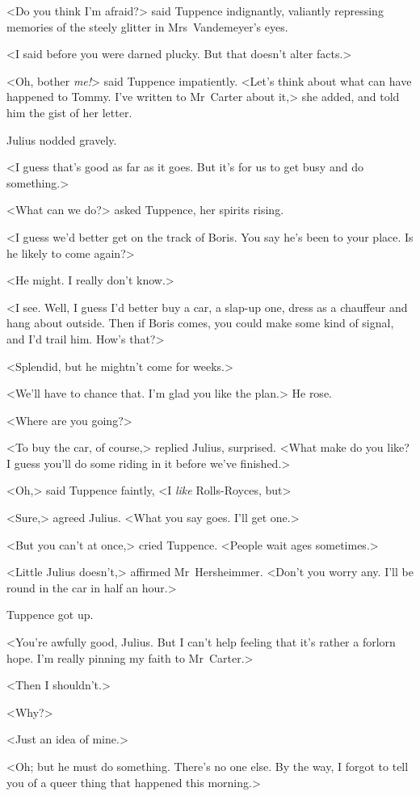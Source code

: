<Do you think I'm afraid?> said Tuppence indignantly, valiantly repressing memories of the steely glitter in Mrs~Vandemeyer's eyes.

<I said before you were darned plucky. But that doesn't alter facts.>

<Oh, bother \emph{me!}> said Tuppence impatiently. <Let's think about what can have happened to Tommy. I've written to Mr~Carter about it,> she added, and told him the gist of her letter.

Julius nodded gravely.

<I guess that's good as far as it goes. But it's for us to get busy and do something.>

<What can we do?> asked Tuppence, her spirits rising.

<I guess we'd better get on the track of Boris. You say he's been to your place. Is he likely to come again?>

<He might. I really don't know.>

<I see. Well, I guess I'd better buy a car, a slap-up one, dress as a chauffeur and hang about outside. Then if Boris comes, you could make some kind of signal, and I'd trail him. How's that?>

<Splendid, but he mightn't come for weeks.>

<We'll have to chance that. I'm glad you like the plan.> He rose.

<Where are you going?>

<To buy the car, of course,> replied Julius, surprised. <What make do you like? I guess you'll do some riding in it before we've finished.>

<Oh,> said Tuppence faintly, <I \emph{like} Rolls-Royces, but\longdash>

<Sure,> agreed Julius. <What you say goes. I'll get one.>

<But you can't at once,> cried Tuppence. <People wait ages sometimes.>

<Little Julius doesn't,> affirmed Mr~Hersheimmer. <Don't you worry any. I'll be round in the car in half an hour.>

Tuppence got up.

<You're awfully good, Julius. But I can't help feeling that it's rather a forlorn hope. I'm really pinning my faith to Mr~Carter.>

<Then I shouldn't.>

<Why?>

<Just an idea of mine.>

<Oh; but he must do something. There's no one else. By the way, I forgot to tell you of a queer thing that happened this morning.>

